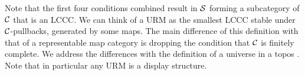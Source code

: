 \begin{dfn}
  Note that the first four conditions combined result in $\mathcal{S}$ forming a subcategory of $\mathcal{C}$ that is an LCCC.
  We can think of a URM as the smallest LCCC stable under $\mathcal{C}$-pullbacks, generated by some maps.
  The main difference of this definition with that of a representable map category is
  dropping the condition that $\mathcal{C}$ is finitely complete.
  We address the differences with the definition of a universe in a topos .
  Note that in particular any URM is a display structure.
\end{dfn}
